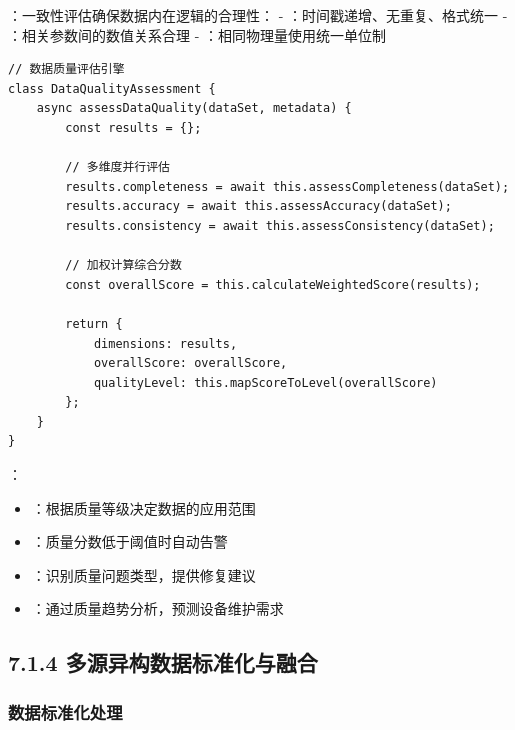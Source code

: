 ：一致性评估确保数据内在逻辑的合理性： - ：时间戳递增、无重复、格式统一 - ：相关参数间的数值关系合理 - ：相同物理量使用统一单位制

\begin{lstlisting}[style=javascript]
// 数据质量评估引擎
class DataQualityAssessment {
    async assessDataQuality(dataSet, metadata) {
        const results = {};
        
        // 多维度并行评估
        results.completeness = await this.assessCompleteness(dataSet);
        results.accuracy = await this.assessAccuracy(dataSet);
        results.consistency = await this.assessConsistency(dataSet);
        
        // 加权计算综合分数
        const overallScore = this.calculateWeightedScore(results);
        
        return {
            dimensions: results,
            overallScore: overallScore,
            qualityLevel: this.mapScoreToLevel(overallScore)
        };
    }
}
\end{lstlisting}

：

\begin{itemize}
\tightlist
\item
  ：根据质量等级决定数据的应用范围
\item
  ：质量分数低于阈值时自动告警
\item
  ：识别质量问题类型，提供修复建议
\item
  ：通过质量趋势分析，预测设备维护需求
\end{itemize}

\hypertarget{ux591aux6e90ux5f02ux6784ux6570ux636eux6807ux51c6ux5316ux4e0eux878dux5408}{%
\subsection{7.1.4 多源异构数据标准化与融合}\label{ux591aux6e90ux5f02ux6784ux6570ux636eux6807ux51c6ux5316ux4e0eux878dux5408}}

\hypertarget{ux6570ux636eux6807ux51c6ux5316ux5904ux7406}{%
\subsubsection{数据标准化处理}\label{ux6570ux636eux6807ux51c6ux5316ux5904ux7406}}


